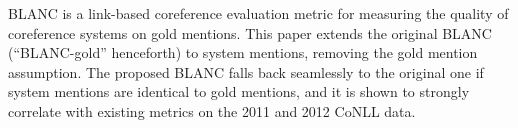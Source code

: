 BLANC is a link-based coreference evaluation metric for measuring the quality of coreference systems on gold mentions. This paper extends the original BLANC (``BLANC-gold'' henceforth) to system mentions, removing the gold mention assumption. The proposed BLANC falls back seamlessly to the original one if system mentions are identical to gold mentions, and it is shown to strongly correlate with existing metrics on the 2011 and 2012 CoNLL data.
